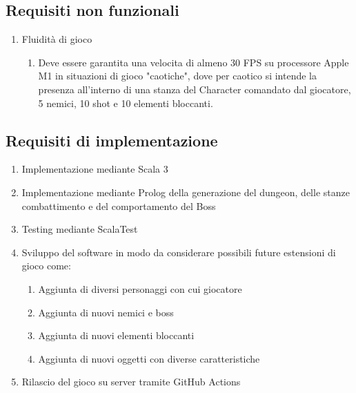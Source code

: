 \subsection{Requisiti non funzionali}

\begin{enumerate}
    \item Fluidità di gioco
    \begin{enumerate}
        \item Deve essere garantita una velocita di almeno 30 FPS su processore Apple M1 in situazioni di gioco "caotiche", dove per caotico si intende la presenza all'interno di una stanza del Character comandato dal giocatore, 5 nemici, 10 shot e 10 elementi bloccanti.
    \end{enumerate}
\end{enumerate}


\subsection{Requisiti di implementazione}

\begin{enumerate}
\item Implementazione mediante Scala 3
\item Implementazione mediante Prolog della generazione del dungeon, delle stanze combattimento e del comportamento del Boss
\item Testing mediante ScalaTest
\item Sviluppo del software in modo da considerare possibili future estensioni di gioco come:
\begin{enumerate}
    \item Aggiunta di diversi personaggi con cui giocatore
    \item Aggiunta di nuovi nemici e boss
    \item Aggiunta di nuovi elementi bloccanti
    \item Aggiunta di nuovi oggetti con diverse caratteristiche
\end{enumerate}
\item Rilascio del gioco su server tramite GitHub Actions
\end{enumerate}
